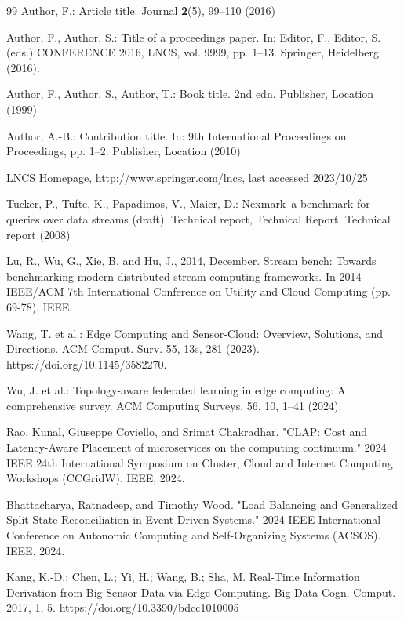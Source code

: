 \documentclass[runningheads]{llncs}
\begin{document}
\begin{thebibliography}{99}
Author, F.: Article title. Journal \textbf{2}(5), 99--110 (2016)

Author, F., Author, S.: Title of a proceedings paper. In: Editor,
F., Editor, S. (eds.) CONFERENCE 2016, LNCS, vol. 9999, pp. 1--13.
Springer, Heidelberg (2016). 

Author, F., Author, S., Author, T.: Book title. 2nd edn. Publisher,
Location (1999)

Author, A.-B.: Contribution title. In: 9th International Proceedings
on Proceedings, pp. 1--2. Publisher, Location (2010)

LNCS Homepage, \url{http://www.springer.com/lncs}, last accessed 2023/10/25

%
Tucker, P., Tufte, K., Papadimos, V., Maier, D.: Nexmark–a benchmark for queries over data streams (draft). Technical report, Technical Report. Technical report (2008)

%
Lu, R., Wu, G., Xie, B. and Hu, J., 2014, December. Stream bench: Towards benchmarking modern distributed stream computing frameworks. In 2014 IEEE/ACM 7th International Conference on Utility and Cloud Computing (pp. 69-78). IEEE.

%
Wang, T. et al.: Edge Computing and Sensor-Cloud: Overview, Solutions, and Directions. ACM Comput. Surv. 55, 13s, 281 (2023). https://doi.org/10.1145/3582270.

%
Wu, J. et al.: Topology-aware federated learning in edge computing: A comprehensive survey. ACM Computing Surveys. 56, 10, 1--41 (2024).

%
Rao, Kunal, Giuseppe Coviello, and Srimat Chakradhar. "CLAP: Cost and Latency-Aware Placement of microservices on the computing continuum." 2024 IEEE 24th International Symposium on Cluster, Cloud and Internet Computing Workshops (CCGridW). IEEE, 2024.

%
Bhattacharya, Ratnadeep, and Timothy Wood. "Load Balancing and Generalized Split State Reconciliation in Event Driven Systems." 2024 IEEE International Conference on Autonomic Computing and Self-Organizing Systems (ACSOS). IEEE, 2024.

%
Kang, K.-D.; Chen, L.; Yi, H.; Wang, B.; Sha, M. Real-Time Information Derivation from Big Sensor Data via Edge Computing. Big Data Cogn. Comput. 2017, 1, 5. https://doi.org/10.3390/bdcc1010005


\end{thebibliography}
\end{document}
